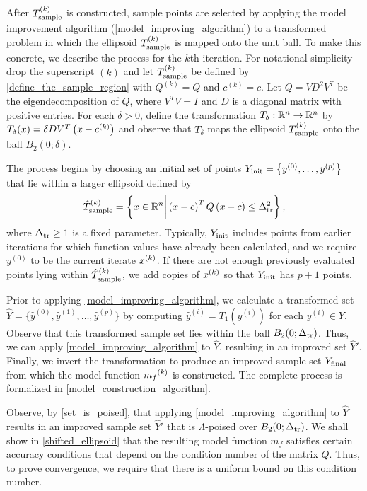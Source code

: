 \documentclass{article}
\begin{document}
After  ${T_{\text{sample}}^{(k)}}$ is constructed,  sample points are selected by applying the model improvement algorithm  (\cref{model_improving_algorithm}) 
to a transformed problem in which the ellipsoid ${T_{\text{sample}}^{(k)}}$ is mapped onto the unit ball.   
To make this concrete,  we describe the process for the $k$th iteration.  For notational simplicity drop the superscript $(k)$ and let ${T_{\text{sample}}^{(k)}}$ be defined by \cref{define_the_sample_region} with $Q^{(k)}=Q$ and $c^{(k)}=c$.     
Let $Q= V D^2 V^T$ be the eigendecomposition  of $Q$, where $V^TV = I$ and $D$ is a diagonal matrix with positive entries.  For each $\delta>0$,  define the transformation
$T_{\delta}:\mathbb R^n \rightarrow \mathbb R^n$ by $T_{\delta}(x) = \delta DV^T\left(x - c^{(k)}\right)$ and observe that $T_{\delta}$ maps the ellipsoid ${T_{\text{sample}}^{(k)}}$ onto the ball $B_2(0;\delta)$.  

The process begins by choosing an initial set of points $Y_{\textrm{init}}=\left\{y^{(0)}, \ldots,  y^{(p)}\right\}$ that 
lie within a larger ellipsoid defined by
\begin{equation}
\label{define_the_big_sample_region}
{\hat{T}_{\text{sample}}^{(k)}} = \left\{x \in \mathbb R^n \bigg | \left(x - c \right)^T Q \left(x - c\right) \le \Delta_{\textrm{tr}}^2 \right\},
\end{equation}
where $\Delta_{\textrm{tr}} \ge 1$ is a fixed parameter. 
Typically, $Y_{\textrm{init}}$ includes points from earlier iterations for which function values have already been calculated,  and we require $y^{(0)}$ to be  the current iterate $x^{(k)}$.    If there are not enough previously evaluated points lying within ${\hat{T}_{\text{sample}}^{(k)}}$,  we add copies of $x^{(k)}$ so that $Y_{\textrm{init}}$ has $p+1$ points.

Prior to applying \cref{model_improving_algorithm},  we calculate a transformed set $\hat{Y}=\{\hat{y}^{(0)}, \hat{y}^{(1)},\ldots,\hat{y}^{(p)}\}$ by computing $\hat{y}^{(i)} = T_1(y^{(i)})$ for each $y^{(i)} \in Y$.    Observe that this transformed sample set lies within the ball $B_2(0;\Delta_{\textrm{tr}})$.   Thus, we can apply \cref{model_improving_algorithm} to $\hat{Y}$, resulting in an improved set $\hat{Y}'$.  Finally, we invert the transformation to produce an improved sample set $Y_{\textrm{final}}$ from which the model function ${{m}_f}^{(k)}$ is constructed.     
The complete process is formalized in \cref{model_construction_algorithm}.

Observe, by \cref{set_is_poised}, that applying 
\cref{model_improving_algorithm} to $\hat{Y}$ results in an improved sample set $\hat{Y}'$ that is $\Lambda$-poised over $B_2(0; \Delta_{\textrm{tr}})$.    We shall show in \cref{shifted_ellipsoid} that the resulting model function $m_f$ satisfies certain accuracy conditions that depend on the condition number of the matrix $Q$.   Thus, to prove convergence, we require that there  is a uniform bound on this condition number.  
\end{document}
